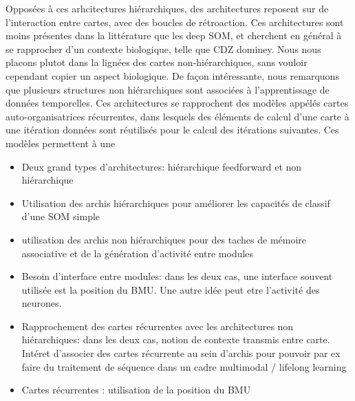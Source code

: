 \documentclass[../main]{subfiles}
\begin{document}
Opposées à ces arhcitectures hiérarchiques, des architectures reposent sur de l'interaction entre cartes, avec des boucles de rétroaction.
Ces architectures sont moins présentes dans la littérature que les deep SOM, et cherchent en général à se rapprocher d'un contexte biologique, telle que CDZ dominey.
Nous nous placons plutot dans la lignées des cartes non-hiérarchiques, sans vouloir cependant copier un aspect biologique.
De façon intéressante, nous remarquons que plusieurs structures non hiérarchiques sont associées à l'apprentissage de données temporelles. Ces architectures se rapprochent des modèles appélés cartes auto-organisatrices récurrentes, dans lesquels des éléments de calcul d'une carte à une itération données sont réutilisés pour le calcul des itérations suivantes. Ces modèles permettent à une 


\begin{itemize}
    \item Deux grand types d'architectures: hiérarchique feedforward et non hiérarchique
    \item Utilisation des archis hiérarchiques pour améliorer les capacités de classif d'une SOM simple
    \item utilisation des archis non hiérarchiques pour des taches de mémoire associative et de la génération d'activité entre modules
    \item Besoin d'interface entre modules: dans les deux cas, une interface souvent utilisée est la position du BMU. Une autre idée peut etre l'activité des neurones.
    \item Rapprochement des cartes récurrentes avec les architectures non hiérarchiques: dans les deux cas, notion de contexte transmis entre carte. Intéret d'associer des cartes récurrente au sein d'archis pour pouvoir par ex faire du traitement de séquence dans un cadre multimodal / lifelong learning
    \item Cartes récurrentes : utilisation de la position du BMU
\end{itemize}
\end{document}
